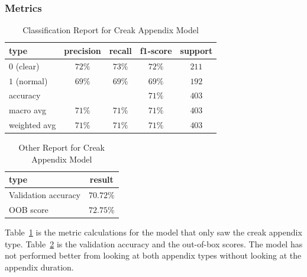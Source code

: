\documentclass[12pt]{article}
\begin{document}
    \subsubsection{Metrics}
    \begin{table}[ht!]
        \centering
        \caption{Classification Report for Creak Appendix Model}
        \label{table:both}
        \begin{tabular}{|l|c|c|c|c|}
            \hline
            \textbf{type} & \textbf{precision} & \textbf{recall} & \textbf{f1-score} & \textbf{support} \\
            \hline
            \hline
            $0$ (clear)   & $72\%$             & $73\%$          & $72\%$            & $211$            \\
            \hline
            $1$ (normal)  & $69\%$             & $69\%$          & $69\%$            & $192$            \\
            \hline
            accuracy      &                    &                 & $71\%$            & $403$            \\
            \hline
            macro avg     & $71\%$             & $71\%$          & $71\%$            & $403$            \\
            \hline
            weighted avg  & $71\%$             & $71\%$          & $71\%$            & $403$            \\
            \hline
        \end{tabular}
    \end{table}

    \begin{table}[ht!]
        \centering
        \caption{Other Report for Creak Appendix Model}
        \label{table:other_results_both}
        \begin{tabular}{|l|c|}
            \hline
            \textbf{type}       & \textbf{result} \\
            \hline
            \hline
            Validation accuracy & $70.72\%$       \\
            \hline
            OOB score           & $72.75\%$       \\
            \hline
        \end{tabular}
    \end{table}

    Table~\ref{table:both} is the metric calculations for the model that only saw
    the creak appendix type. Table~\ref{table:other_results_both} is the
    validation accuracy and the out-of-box scores. The model has not performed better
    from looking at both appendix types without looking at the appendix duration.
\end{document}
